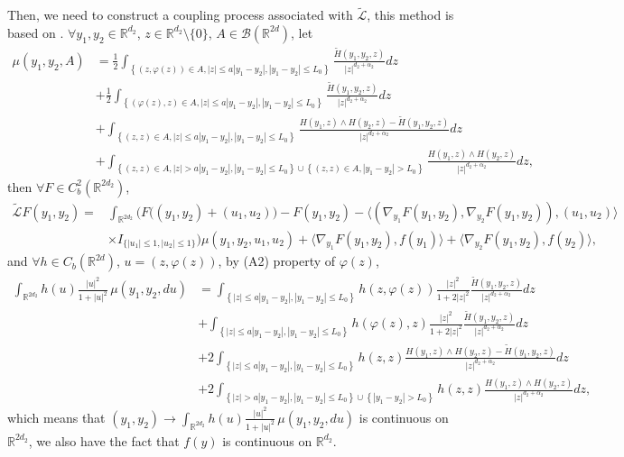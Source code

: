 \documentclass[11pt,reqno]{amsart}
\numberwithin{equation}{section}
\newcommand{\R}{\mathbb{R}}
\begin{document}
Then, we need to construct a coupling process associated with $\widetilde{\mathcal{L}}$, this method is based on \cite[Section 2.2]{JW2}.  $\forall y_1,y_2\in\R^{d_2}$, $ z\in \R^{d_2}\setminus \{0\}$,  $A\in \mathscr{B}(\R^{2d})$, let 
\begin{align*}
{\mu}(y_1,y_2,A)&=\frac{1}{2}\int_{\left\{(z,\varphi(z))\in A,|z|\le a|y_1-y_2|,|y_1-y_2|\leq L_0 \right\}}\frac{\widetilde{H}(y_1,y_2,z)}{|z|^{d_2+\alpha_2}}dz\\
&+\frac{1}{2}\int_{\left\{(\varphi(z),z)\in
A,|z|\le a|y_1-y_2|,|y_1-y_2|\leq L_0\right\}}\frac{\widetilde{H}(y_1,y_2,z)}{|z|^{d_2+\alpha_2}}dz\\
&+\int_{\left\{(z,z)\in A,|z|\leq a|y_1-y_2|,|y_1-y_2|\leq L_0\right\}}
\frac{H(y_1,z)\wedge H(y_2,z)-\widetilde{H}(y_1,y_2,z)}{|z|^{d_2+\alpha_2}}dz\\
&+\int_{\left\{(z,z)\in A,|z|> a|y_1-y_2|,|y_1-y_2|\leq L_0\right\}\cup \left\{(z,z)\in A,|y_1-y_2|> L_0\right\}}\frac{H(y_1,z)\wedge H(y_2,z)}{|z|^{d_2+\alpha_2}}dz,
\end{align*}
then $\forall F\in C^2_b(\R^{2d_2})$, 
\begin{align*}
\widetilde{\mathcal{L}}F(y_1,y_2)=&\int_{\R^{2d_2}}\Big(F\big((y_1,y_2)+(u_1,u_2)\big)-F(y_1,y_2)-\big\langle (\nabla_{y_1}F(y_1,y_2),\nabla_{y_2}F(y_1,y_2)), (u_1,u_2)\big\rangle\\
&\times I_{\{|u_1|\le1, |u_2|\le1\}}\Big)\mu(y_1,y_2,u_1,u_2)+\langle\nabla_{y_1}F(y_1,y_2),f(y_1)\rangle+\langle\nabla_{y_2}F(y_1,y_2),f(y_2)\rangle,
\end{align*}
and $\forall h\in C_b(\R^{2d})$, $u=(z,\varphi(z))$, by (A2) property of $\varphi(z)$,
\begin{align*}
\int_{\R^{2d_2}} h(u)\frac{|u|^2}{1+|u|^2}\,{\mu}(y_1,y_2,du)&=\int_{\left\{|z|\le a|y_1-y_2|, |y_1-y_2|\leq L_0\right\}}h(z,\varphi(z))\frac{|z|^2}{1+2|z|^2}
\frac{\widetilde{H}(y_1,y_2,z)}{|z|^{d_2+\alpha_2}}dz\\
&+\int_{\left\{|z|\le a|y_1-y_2|, |y_1-y_2|\leq L_0\right\}}h(\varphi(z),z)\frac{|z|^2}{1+2|z|^2}
\frac{\widetilde{H}(y_1,y_2,z)}{|z|^{d_2+\alpha_2}}dz\\
&+2\int_{\left\{|z|\leq a|y_1-y_2|,|y_1-y_2|\leq L_0\right\}}h(z,z)
\frac{H(y_1,z)\wedge H(y_2,z)-\widetilde{H}(y_1,y_2,z)}{|z|^{d_2+\alpha_2}}dz\\
&+2\int_{\left\{|z|> a|y_1-y_2|,|y_1-y_2|\leq L_0\right\}\cup \left\{|y_1-y_2|> L_0\right\}}h(z,z)\frac{H(y_1,z)\wedge H(y_2,z)}{|z|^{d_2+\alpha_2}}dz,
\end{align*}
which means that $(y_1,y_2)\rightarrow\int_{\R^{2d_2}} h(u)\frac{|u|^2}{1+|u|^2}\,{\mu}(y_1,y_2,du)$ is continuous on $\R^{2d_2}$, we also have the fact that $f(y)$ is continuous on $\R^{d_2}$.  
\end{document}
